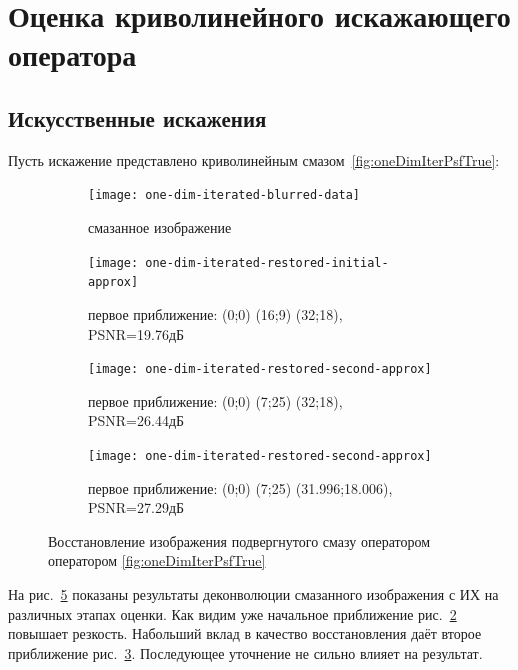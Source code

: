 \section{Оценка криволинейного искажающего оператора}
\subsection{Искусственные искажения}
Пусть искажение представлено криволинейным смазом~\ref{fig:oneDimIterPsfTrue}:
\begin{figure}[h!]
	\begin{subfigure}[t]{0.45\textwidth}
		\centering
		\texttt{[image: one-dim-iterated-blurred-data]}
		\caption{смазанное изображение}
		\label{fig:oneDimIterBlurred}
	\end{subfigure}
	\hfill
	\begin{subfigure}[t]{0.45\textwidth}
		\centering
		\texttt{[image: one-dim-iterated-restored-initial-approx]}
		\caption{первое приближение: (0;0) (16;9) (32;18), PSNR=19.76дБ}
		\label{fig:oneDimIterInitial}
	\end{subfigure}

	\begin{subfigure}[t]{0.45\textwidth}
		\centering
		\texttt{[image: one-dim-iterated-restored-second-approx]}
		\caption{первое приближение: (0;0) (7;25) (32;18), PSNR=26.44дБ}
		\label{fig:oneDimIterSecond}
	\end{subfigure}
	\hfill
	\begin{subfigure}[t]{0.45\textwidth}
		\centering
		\texttt{[image: one-dim-iterated-restored-second-approx]}
		\caption{первое приближение: (0;0) (7;25) (31.996;18.006), PSNR=27.29дБ}
		\label{fig:oneDimIterFinal}
	\end{subfigure}
	\caption{Восстановление изображения подвергнутого смазу оператором  оператором \ref{fig:oneDimIterPsfTrue}}
	\label{fig:oneDimIter}
\end{figure}
На рис.~\ref{fig:oneDimIter} показаны результаты деконволюции смазанного изображения с ИХ на различных этапах оценки. Как видим уже начальное приближение рис.~\ref{fig:oneDimIterInitial} повышает резкость. Набольший вклад в качество восстановления даёт второе приближение рис.~\ref{fig:oneDimIterSecond}. Последующее уточнение не сильно влияет на результат.

